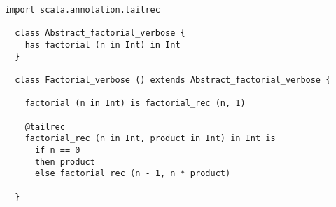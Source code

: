 \documentclass[12pt,a4paper]{book}
\begin{document}
    \begin{lstlisting}[label={lst:exampleFactorialVerbose}]
  import scala.annotation.tailrec

  class Abstract_factorial_verbose {
    has factorial (n in Int) in Int
  }

  class Factorial_verbose () extends Abstract_factorial_verbose {

    factorial (n in Int) is factorial_rec (n, 1)

    @tailrec
    factorial_rec (n in Int, product in Int) in Int is
      if n == 0
      then product
      else factorial_rec (n - 1, n * product)

  }
    \end{lstlisting}
\end{document}
